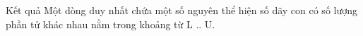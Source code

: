 Kết quả  
Một dòng duy nhất chứa một số nguyên thể hiện số dãy con có số lượng phần tử khác nhau nằm trong khoảng từ L .. U.